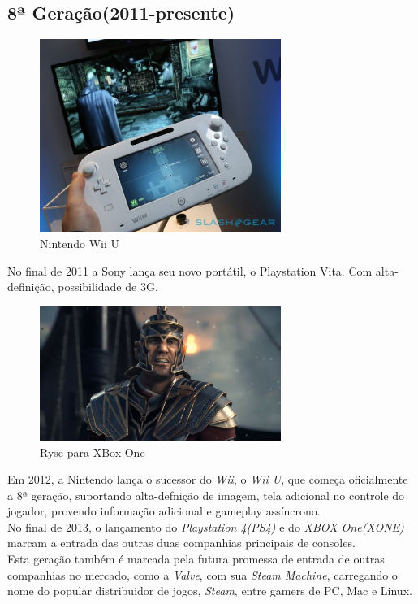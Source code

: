 \documentclass[paper=a4, fontsize=11pt]{scrartcl}	%
\numberwithin{equation}{section}															%
\numberwithin{figure}{section}																%
\numberwithin{table}{section}																%
\begin{document}
\subsection{8ª Geração(2011-presente)}
\begin{figure}[h!]
	\centering
    \includegraphics[width=0.7\textwidth]{img/wiiu}
    \caption{Nintendo Wii U}
\end{figure}
No final de 2011 a Sony lança seu novo portátil, o Playstation Vita. Com alta-definição, possibilidade de 3G.\\
\begin{figure}[h!]
	\centering
    \includegraphics[width=0.7\textwidth]{img/ryse}
    \caption{Ryse para XBox One}
\end{figure}
Em 2012, a Nintendo lança o sucessor do \textit{Wii}, o \textit{Wii U}, que começa oficialmente a 8ª geração, suportando alta-defnição de imagem, tela adicional no controle do jogador, provendo informação adicional e gameplay assíncrono.\\
No final de 2013, o lançamento do \textit{Playstation 4(PS4)} e do \textit{XBOX One(XONE)} marcam a entrada das outras duas companhias principais de consoles.\\
Esta geração também é marcada pela futura promessa de entrada de outras companhias no mercado, como a \textit{Valve}, com sua \textit{Steam Machine}, carregando o nome do popular distribuidor de jogos, \textit{Steam}, entre gamers de PC, Mac e Linux.
\end{document}
